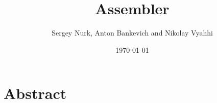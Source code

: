 \documentclass[12pt]{article}
\title{Assembler}
\author{Sergey Nurk, Anton Bankevich and Nikolay Vyahhi}
\date{\today}
\begin{document}
\maketitle

\section{Abstract}
\end{document}
